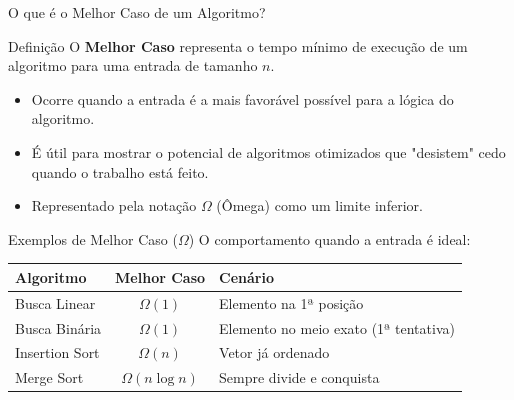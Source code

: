 \documentclass[9pt]{beamer}
\begin{document}
\begin{frame}{O que é o Melhor Caso de um Algoritmo?}
    \begin{block}{Definição}
        O \textbf{Melhor Caso} representa o tempo mínimo de execução de um algoritmo para uma entrada de tamanho $n$.
    \end{block}
    \vspace{0.4cm}
    \begin{itemize}
        \item Ocorre quando a entrada é a mais favorável possível para a lógica do algoritmo.
        \item É útil para mostrar o potencial de algoritmos otimizados que "desistem" cedo quando o trabalho está feito.
        \item Representado pela notação $\Omega$ (Ômega) como um limite inferior.
    \end{itemize}
\end{frame}

\begin{frame}{Exemplos de Melhor Caso ($\Omega$)}
    O comportamento quando a entrada é ideal:
    \vspace{0.3cm}
    \begin{table}
        \centering
        \begin{tabular}{l|c|l}
            \hline
            \textbf{Algoritmo} & \textbf{Melhor Caso} & \textbf{Cenário} \\
            \hline
            Busca Linear & $\Omega(1)$ & Elemento na 1ª posição \\
            Busca Binária & $\Omega(1)$ & Elemento no meio exato (1ª tentativa) \\
            Insertion Sort & $\Omega(n)$ & Vetor já ordenado \\
            Merge Sort & $\Omega(n \log n)$ & Sempre divide e conquista \\
            \hline
        \end{tabular}
    \end{table}
\end{frame}
\end{document}
